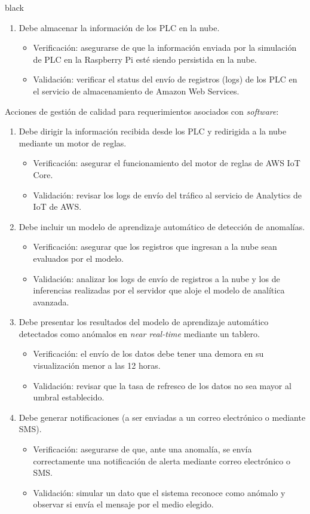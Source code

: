 \documentclass[11pt]{charter}
\begin{document}
\begin{consigna}{black}
\begin{enumerate}
	\item Debe almacenar la información de los PLC en la nube.
		\begin{itemize}
	\item Verificación: asegurarse de que la información enviada por la simulación de PLC en la Raspberry Pi esté siendo persistida en la nube.
	\item Validación: verificar el status del envío de registros (logs) de los PLC en el servicio de almacenamiento de Amazon Web Services.
	\end{itemize}
	\end{enumerate}

Acciones de gestión de calidad para requerimientos asociados con \textit{software}:
	\begin{enumerate}
	\item Debe dirigir la información recibida desde los PLC y redirigida a la nube mediante un motor de reglas.
	\begin{itemize}
	\item Verificación: asegurar el funcionamiento del motor de reglas de AWS IoT Core.
	\item Validación: revisar los logs de envío del tráfico al servicio de Analytics de IoT de AWS.
	\end{itemize}
	\item Debe incluir un modelo de aprendizaje automático de detección de anomalías.
	\begin{itemize}
	\item Verificación: asegurar que los registros que ingresan a la nube sean evaluados por el modelo.
	\item Validación: analizar los logs de envío de registros a la nube y los de inferencias realizadas por el servidor que aloje el modelo de analítica avanzada. 
	\end{itemize}
	\item Debe presentar los resultados del modelo de aprendizaje automático detectados como anómalos en \textit{near real-time} mediante un tablero.
	\begin{itemize}
	\item Verificación: el envío de los datos debe tener una demora en su visualización menor a las 12 horas.
	\item Validación: revisar que la tasa de refresco de los datos no sea mayor al umbral establecido.
	\end{itemize}
	\item Debe generar notificaciones (a ser enviadas a un correo electrónico o mediante SMS).
	\begin{itemize}
	\item Verificación: asegurarse de que, ante una anomalía, se envía correctamente una notificación de alerta mediante correo electrónico o SMS.
	\item Validación: simular un dato que el sistema reconoce como anómalo y observar si envía el mensaje por el medio elegido.
	\end{itemize}
	\end{enumerate}

\end{consigna}
\end{document}
